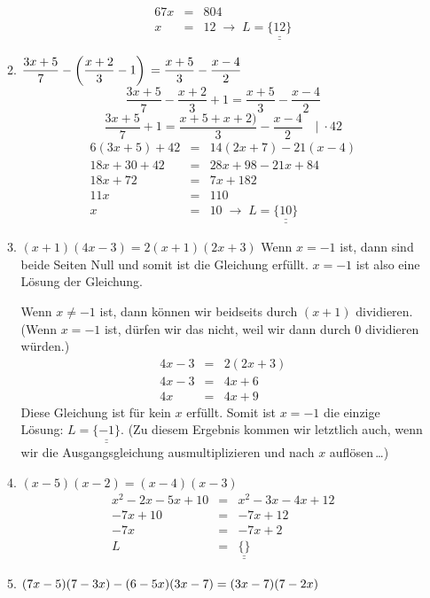 \documentclass[%
11pt,%
twoside,%
titlepage,%
german,%
]{scrartcl}
\newcommand{\result}[1]{\underline{\underline{#1}}}
\begin{document}
\begin{enumerate}
\begin{enumerate}
\begin{eqnarray*}
      67x & = & 804 \\
      x & = & 12 \;\to\; L=\result{\{12\}}
    \end{eqnarray*}
  \item $\displaystyle \frac{3x+5}{7}-\left(\frac{x+2}{3}-1\right) \\ =\frac{x+5}{3}-\frac{x-4}{2}$
    \begin{displaymath}
      \frac{3x+5}{7}-\frac{x+2}{3}+1 = \frac{x+5}{3}-\frac{x-4}{2}
    \end{displaymath}
    \begin{displaymath}
      \frac{3x+5}{7} + 1 = \frac{x+5+x+2)}{3} - \frac{x-4}{2} \quad |\;\cdot 42
    \end{displaymath}
    \begin{eqnarray*}
       6(3x+5) + 42 & = & 14(2x+7) - 21(x-4) \\
       18x + 30 + 42 & = & 28x+98 - 21x+84 \\
       18x + 72 & = & 7x + 182 \\
       11x & = & 110 \\
       x & = & 10 \;\to\; L=\result{\{10\}}
    \end{eqnarray*}
  \item $\displaystyle (x+1)(4x-3) = 2(x+1)(2x+3)$
    Wenn $x=-1$ ist, dann sind beide Seiten Null und somit ist die Gleichung erf\"ullt. $x=-1$ ist also eine L\"osung der Gleichung. 

Wenn $x\neq -1$ ist, dann k\"onnen wir beidseits durch $(x+1)$ dividieren. (Wenn $x=-1$ ist, d\"urfen wir das nicht, weil wir dann durch 0 dividieren w\"urden.)
    \begin{eqnarray*}
      4x-3 & = & 2(2x+3) \\
      4x-3 & = & 4x+6 \\
      4x & = & 4x + 9
    \end{eqnarray*}
    Diese Gleichung ist f\"ur kein $x$ erf\"ullt. Somit ist $x=-1$ die einzige L\"osung: $L=\result{\{-1\}}$. (Zu diesem Ergebnis kommen wir letztlich auch, wenn wir die Ausgangsgleichung ausmultiplizieren und nach $x$ aufl\"osen\,\ldots)
  \item $\displaystyle (x-5)(x-2)=(x-4)(x-3)$
    \begin{eqnarray*}
      x^2 -2x -5x +10 & = & x^2-3x-4x+12 \\
      -7x + 10 & = & -7x + 12 \\
      -7x & = & -7x + 2 \\
      L & = & \result{\{\}}
    \end{eqnarray*}
  \item $\displaystyle (7x-5)(7-3x)-(6-5x)(3x-7) \\ =(3x-7)(7-2x)$


\end{enumerate}
\end{enumerate}
\end{document}
